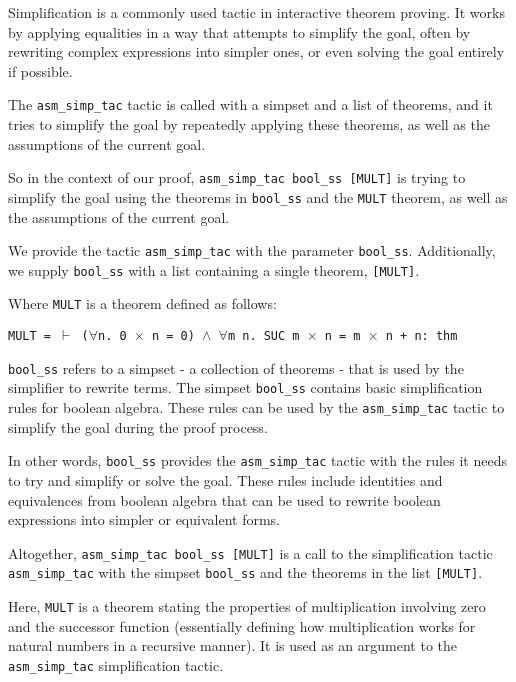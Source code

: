 Simplification is a commonly used tactic in interactive theorem proving. It works by applying equalities in a way that attempts to simplify the goal, often by rewriting complex expressions into simpler ones, or even solving the goal entirely if possible.

The \texttt{asm\_simp\_tac} tactic is called with a simpset and a list of theorems, and it tries to simplify the goal by repeatedly applying these theorems, as well as the assumptions of the current goal.

So in the context of our proof, \texttt{asm\_simp\_tac bool\_ss [MULT]} is trying to simplify the goal using the theorems in \texttt{bool\_ss} and the \texttt{MULT} theorem, as well as the assumptions of the current goal.

We provide the tactic \texttt{asm\_simp\_tac} with the parameter \texttt{bool\_ss}. Additionally, we supply \texttt{bool\_ss} with a list containing a single theorem, \texttt{[MULT]}.

Where \texttt{MULT} is a theorem defined as follows:
\begin{flushleft}
\texttt{MULT = $\vdash$ ($\forall$n. 0 $\times$ n = 0) $\land$ $\forall$m n. SUC m $\times$ n = m $\times$ n + n: thm}
\end{flushleft}

\texttt{bool\_ss} refers to a simpset - a collection of theorems - that is used by the simplifier to rewrite terms. The simpset \texttt{bool\_ss} contains basic simplification rules for boolean algebra. These rules can be used by the \texttt{asm\_simp\_tac} tactic to simplify the goal during the proof process. 

In other words, \texttt{bool\_ss} provides the \texttt{asm\_simp\_tac} tactic with the rules it needs to try and simplify or solve the goal. These rules include identities and equivalences from boolean algebra that can be used to rewrite boolean expressions into simpler or equivalent forms.

Altogether, \texttt{asm\_simp\_tac bool\_ss [MULT]} is a call to the simplification tactic \texttt{asm\_simp\_tac} with the simpset \texttt{bool\_ss} and the theorems in the list \texttt{[MULT]}. 

Here, \texttt{MULT} is a theorem stating the properties of multiplication involving zero and the successor function (essentially defining how multiplication works for natural numbers in a recursive manner). It is used as an argument to the \texttt{asm\_simp\_tac} simplification tactic.

